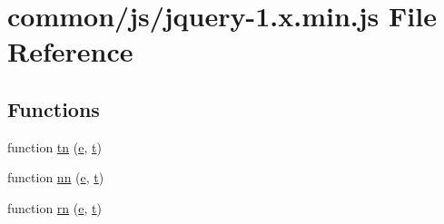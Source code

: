\hypertarget{jquery-1_8x_8min_8js}{}\section{common/js/jquery-\/1.x.\+min.\+js File Reference}
\label{jquery-1_8x_8min_8js}
\subsection*{Functions}
\begin{DoxyCompactItemize}
\item 
function \hyperlink{jquery-1_8x_8min_8js_a9372ffea5788fa8dc44b8fc18aba3118}{tn} (\hyperlink{jqplot_8barRenderer_8min_8js_a2ce90ea5f2a400a3a152319491a737ff}{e}, \hyperlink{jquery_8min_8js_aaccc9105df5383111407fd5b41255e23}{t})
\item 
function \hyperlink{jquery-1_8x_8min_8js_a11655b827ec323fed5b6a764f93b9ece}{nn} (\hyperlink{jqplot_8barRenderer_8min_8js_a2ce90ea5f2a400a3a152319491a737ff}{e}, \hyperlink{jquery_8min_8js_aaccc9105df5383111407fd5b41255e23}{t})
\item 
function \hyperlink{jquery-1_8x_8min_8js_a683a60c6ff4ff96a79f34e54fc8cc972}{rn} (\hyperlink{jqplot_8barRenderer_8min_8js_a2ce90ea5f2a400a3a152319491a737ff}{e}, \hyperlink{jquery_8min_8js_aaccc9105df5383111407fd5b41255e23}{t})
\item 

\end{DoxyCompactItemize}
